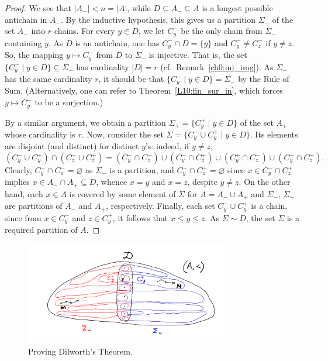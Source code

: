 \documentclass[12pt,notitlepage]{article}
\theoremstyle{plain}
\theoremstyle{definition}
\theoremstyle{plain}
\newcommand{\sbs}{\subseteq}
\newcommand{\void}{\varnothing}
\newcommand{\1}{\mathbf{1}}
\newcommand{\0}{\mathbf{0}}
\begin{document}
\begin{proof}
	We see that $|A_{-}| < n = |A|$, while $D \sbs A_{-} \sbs A$ is a longest possible antichain in $A_{-}$. By the inductive hypothesis, this gives us a partition $\Sigma_{-}$ of the set $A_{-}$ into $r$ chains. For every $y \in D$, we let $C_y^{-}$ be the only chain from $\Sigma_{-}$ containing $y$. As $D$ is an antichain, one has $C^{-}_y \cap D = \{ y \}$ and $C^{-}_y \neq C^{-}_z$ if $y \neq z$. So, the mapping $y \mapsto C^{-}_y$ from $D$ to $\Sigma_{-}$ is injective. That is, the set $\{ C^-_y  \mid y \in D \} \sbs \Sigma_{-}$ has cardinality $|D| = r$ (cf.~Remark~\ref{ch0:inj_img}). As $\Sigma_{-}$ has the same cardinality $r$, it should be that $\{ C^-_y  \mid y \in D \} = \Sigma_{-}$ by the Rule of Sum. (Alternatively, one can refer to Theorem~\ref{L10:fin_sur_in}, which forces $y \mapsto C^{-}_y$ to be a surjection.)
	
	By a similar argument, we obtain a partition $\Sigma_{+} = \{ C^+_y  \mid y \in D \}$ of the set $A_{+}$ whose cardinality is $r$. Now, consider the set $\Sigma = \{ C^-_y \cup C^+_y \mid y \in D \}$. Its elements  are disjoint (and distinct) for distinct $y$'s: indeed, if $y \neq z$,
	$$(C^-_y \cup C^+_y) \cap (C^-_z \cup C^+_z) = (C^-_y \cap C^-_z) \cup (C^-_y \cap C^+_z) \cup (C^+_y \cap C^-_z) \cup (C^+_y \cap C^+_z).$$
	Clearly, $C^-_y \cap C^-_z = \void$ as $\Sigma_-$ is a partition, and $C^-_y \cap C^+_z = \void$ since $x \in C^-_y \cap C^+_z$ implies $x \in A_- \cap A_+ \sbs D$, whence $x = y$ and $x = z$, despite $y \neq z$. On the other hand, each $x \in A$ is covered by some element of $\Sigma$ for $A = A_{-} \cup A_{+}$ and $\Sigma_-$, $\Sigma_+$ are partitions of $A_{-}$ and $A_{+}$, respectively. Finally, each set $C^-_y \cup C^+_y$ is a chain, since from $x \in C^-_y$ and $z \in C^+_y$, it follows that $x \leq y \leq z$.  As $\Sigma \sim D$, the set $\Sigma$ is a required partition of $A$.
\end{proof}

\begin{figure}[h]
	\centering
	\includegraphics*[width=0.8\textwidth]{dilworth.pdf}
	\caption{Proving Dilworth's Theorem.}
\end{figure}
\end{document}

